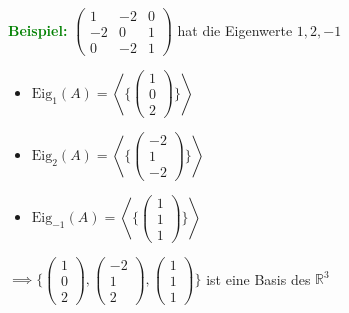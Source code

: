 \documentclass{article}
\newcommand{\green}[1]{\textcolor{green}{#1}}
\newcommand{\ex}{\green{\textbf{Beispiel: }}}
\newcommand{\R}{\mathbb{R}}
\newcommand{\vvvec}[3]{\begin{pmatrix}#1\\#2\\#3\end{pmatrix}}
\newcommand{\spann}[1]{\left\langle#1\right\rangle}
\newcommand{\eig}{\text{Eig}}
\begin{document}
\ex $\begin{pmatrix}
    1 & -2 & 0\\
    -2 & 0 & 1\\
    0 & -2 & 1
\end{pmatrix}$ hat die Eigenwerte $1,2,-1$

\begin{itemize}
    \item $\eig_1(A) = \spann{\{\vvvec{1}{0}{2}\}}$
    \item $\eig_2(A) = \spann{\{\vvvec{-2}{1}{-2}\}}$
    \item $\eig_{-1}(A) = \spann{\{\vvvec{1}{1}{1}\}}$
\end{itemize}

$\implies \{\vvvec{1}{0}{2}, \vvvec{-2}{1}{2}, \vvvec{1}{1}{1}\}$ ist eine Basis des $\R^3$
\end{document}
